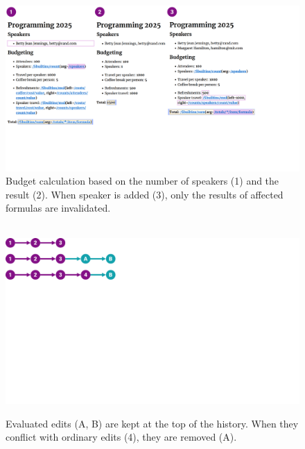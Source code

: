 \documentclass[sigconf,anonymous,screen]{acmart}
\begin{document}

\begin{figure}[t]
  \includegraphics[width=1\columnwidth,clip,trim=0.1cm 5cm 5.1cm 0cm]{fig/incremental.pdf}
  \vspace{-1em}
  \caption{Budget calculation based on the number of speakers (1) and the result (2). When speaker
  is added (3), only the results of affected formulas are invalidated.}
  \label{fig:incremental}
  \vspace{-1em}
\end{figure}



\begin{figure}[t]
\centering
\vspace{-0.5em}
\begin{minipage}{0.55\columnwidth}
  ~\\[1em]
  \includegraphics[width=0.9\columnwidth,clip,trim=0cm 14cm 21cm 0cm]{fig/eval.pdf}
  \end{minipage}%
  \begin{minipage}{0.45\columnwidth}
    \caption{Evaluated edits (A, B) are kept at the top of the history. When they conflict with
    ordinary edits (4), they are removed (A).}
    \label{fig:eval}
  \end{minipage}
  \vspace{-1em}
\end{figure}
\end{document}
